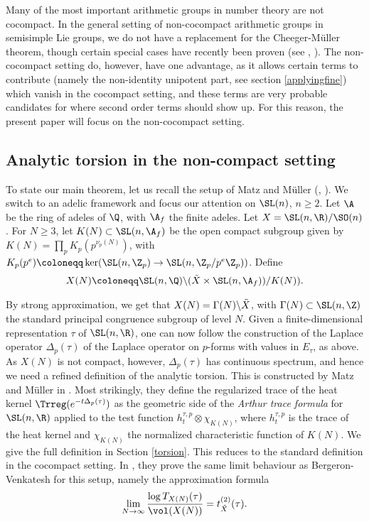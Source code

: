 Many of the most important arithmetic groups in number theory are not cocompact. In the general setting of non-cocompact arithmetic groups in semisimple Lie groups, we do not have a replacement for the Cheeger-Müller theorem, though certain special cases have recently been proven (see \cite{MR1}, \cite{MR3}). The non-cocompact setting do, however, have one  advantage, as it allows certain terms to contribute (namely the non-identity unipotent part, see section \ref{applyingfine}) which vanish in the cocompact setting, and these terms are very probable candidates for where second order terms should show up. For this reason, the present paper will focus on the non-cocompact setting. 

\subsection{Analytic torsion in the non-compact setting} 

To state our main theorem, let us recall the setup of Matz and Müller (\cite{MzM1}, \cite{MzM2}). We switch to an adelic framework and focus our attention on $\SL(n)$, $n\geq 2$. Let $\A$ be the ring of adeles of $\Q$, with $\A_f$ the finite adeles. Let $X=\SL(n,\R)/\SO(n)$. For $N\geq 3$, let $K(N)\subset \SL(n,\A_f)$ be the open compact subgroup given by $K(N)=\prod_p K_p(p^{\nu_p(N)})$, with $K_p(p^e)\coloneqq \ker(\SL(n,\Z_p)\to \SL(n,\Z_p/p^e\Z_p))$. Define
\begin{align*}
    X(N) \coloneqq \SL(n,\Q)\backslash (\Tilde{X}\times \SL(n,\A_f))/K(N)).
\end{align*}

\noindent By strong approximation, we get that $X(N) = \Gamma(N)\backslash \Tilde{X}$, with $\Gamma(N)\subset \SL(n,\Z)$ the standard principal congruence subgroup of level $N$. Given a finite-dimensional representation $\tau$ of $\SL(n,\R)$, one can now follow the construction of the Laplace operator $\Delta_p(\tau)$ of the Laplace operator on $p$-forms with values in $E_\tau$, as above. As $X(N)$ is not compact, however, $\Delta_p(\tau)$ has continuous spectrum, and hence we need a refined definition of the analytic torsion. This is constructed by Matz and Müller in \cite{MzM1}. Most strikingly, they define the regularized trace of the heat kernel $\Trreg(e^{-t\Delta_p(\tau)})$ as the geometric side of the \textit{Arthur trace formula} for $\SL(n,\R)$ applied to the test function $h_t^{\tau,p}\otimes \chi_{K(N)}$, where $h_t^{\tau,p}$ is the trace of the heat kernel and $\chi_{K(N)}$ the normalized characteristic function of $K(N)$. We give the full definition in 
Section \ref{torsion}. This reduces to the standard definition in the cocompact setting. In \cite{MzM2}, they prove the same limit behaviour as Bergeron-Venkatesh for this setup, namely the approximation formula
\begin{align*}
    \lim_{N\to\infty}\frac{\log T_{X(N)}(\tau)}{\vol(X(N))} = t^{(2)}_{\Tilde{X}}(\tau).
\end{align*}

